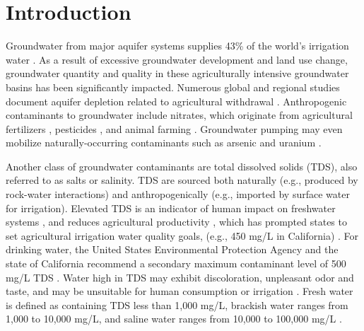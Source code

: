 \section{Introduction}  


Groundwater from major aquifer systems supplies 43\% of the world's irrigation water \citep{Siebert2010}. As a result of excessive groundwater development and land use change, groundwater quantity and quality in these agriculturally intensive groundwater basins has been significantly impacted. Numerous global and regional studies document aquifer depletion related to agricultural withdrawal \citep{Brush2013, Doll2012, Famiglietti2014, Faunted.2009, Gleeson2012, Russo2017, Scanlon2012, Siebert2010, Vorosmarty2014, Wada2014}. Anthropogenic contaminants to groundwater include nitrates, which originate from agricultural fertilizers \citep{Burow2008}, pesticides \citep{Burow2008, Burow1998}, and animal farming \citep{Harter2012}. Groundwater pumping may even mobilize naturally-occurring contaminants such as arsenic \citep{winkel2011arsenic, smith2018overpumping} and uranium \citep{Jurgens2008, Jurgens2010}.

Another class of groundwater contaminants are total dissolved solids (TDS), also referred to as salts or salinity. TDS are sourced both naturally (e.g., produced by rock-water interactions) and anthropogenically (e.g., imported by surface water for irrigation). 
Elevated TDS is an indicator of human impact on freshwater systems \citep{Ayers1985, Kaushal2014}, and reduces agricultural productivity \citep{Lopez-Berenguer2009, Munns2002, Pessarakli2011}, which has prompted states to set agricultural irrigation water quality goals, (e.g., 450 mg/L in California) \citep{swrcb2019b}. For drinking water, the United States Environmental Protection Agency and the state of California recommend a secondary maximum contaminant level of 500 mg/L TDS \citep{swrcb2019a, swrcb2019b}. Water high in TDS may exhibit discoloration, unpleasant odor and taste, and may be unsuitable for human consumption or irrigation \citep{Hem1985}. Fresh water is defined as containing TDS less than 1,000 mg/L, brackish water ranges from 1,000 to 10,000 mg/L, and saline water ranges from 10,000 to 100,000 mg/L \citep{Fetter2001}. 

